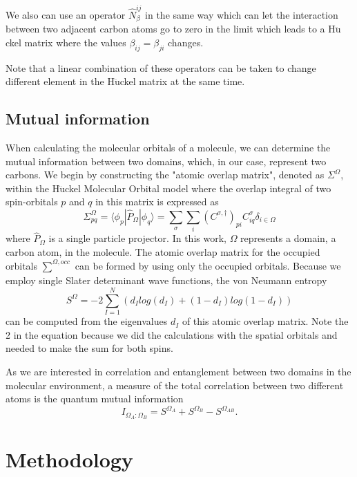 \documentclass[twoside,twocolumn,9pt]{article}
\begin{document}
We also can use an operator $\hat{N}_{\beta}^{ij}$ in the same way which can let the interaction between two adjacent carbon atoms go to zero in the limit which leads to a H$\ddot{\text{u}}$ckel matrix where the values $\beta_{ij} = \beta_{ji}$ changes.

Note that a linear combination of these operators can be taken to change different element in the H$\ddot{\text{u}}$ckel matrix at the same time. 


\subsection{Mutual information}
When calculating the molecular orbitals of a molecule, we can determine the mutual information between two domains, which, in our case, represent two carbons. We begin by constructing the "atomic overlap matrix", denoted as $\Sigma^{\Omega}$, within the H$\ddot{\text{u}}$ckel Molecular Orbital model where the overlap integral of two spin-orbitals $p$ and $q$ in this matrix is expressed as
\begin{equation}
  \Sigma^{\Omega}_{pq} = \langle \phi_p |\hat{P}_{\Omega} | \phi_q \rangle = 
  \sum_{\sigma}\sum_{i}(C^{\sigma,\dagger})_{pi}C^{\sigma}_{iq}\delta_{i\in\Omega}
  \label{overlap matrix}
\end{equation}
where $\hat{P}_{\Omega}$ is a single particle projector.
In this work, $\Omega$ represents a domain, a carbon atom, in the molecule.
The atomic overlap matrix for the occupied orbitals $\sum_{}^{\Omega,occ}$ can be formed by using only the occupied orbitals. Because we employ single Slater determinant wave functions, the von Neumann entropy 
\begin{equation}
  S^\Omega = - 2\sum_{I=1}^{N}(d_I log(d_I) + (1-d_I)log(1-d_I))
\end{equation}
can be computed from the eigenvalues $d_I$ of this atomic overlap matrix. Note the 2 in the equation because we did the calculations with the spatial orbitals and needed to make the sum for both spins.

As we are interested in correlation and entanglement between two domains in the molecular environment, a measure of the total correlation between two different atoms is the quantum mutual information
\begin{equation}
  I_{\Omega_A:\Omega_B} = S^{\Omega_A} + S^{\Omega_B} - S^{\Omega_{AB}}.
\end{equation}



\section{Methodology}
\end{document}
